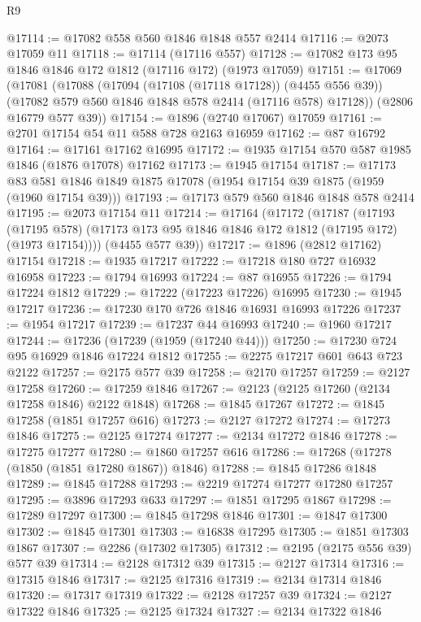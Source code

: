 \begin{lexlean}{R9}
\begin{coremodule}
@17114 := @17082 @558 @560 @1846 @1848 @557 @2414
@17116 := @2073 @17059 @11
@17118 := @17114 (@17116 @557)
@17128 := @17082 @173 @95 @1846 @1846 @172 @1812 (@17116 @172) (@1973 @17059)
@17151 := @17069
    (@17081
      (@17088
        (@17094 (@17108 (@17118 @17128)) (@4455 @556 @39))
        (@17082 @579 @560 @1846 @1848 @578 @2414 (@17116 @578) @17128))
      (@2806 @16779 @577 @39))
@17154 := @1896 (@2740 @17067) @17059
@17161 := @2701 @17154 @54 @11 @588 @728 @2163 @16959
@17162 := @87 @16792
@17164 := @17161 @17162 @16995
@17172 := @1935 @17154 @570 @587 @1985 @1846 (@1876 @17078) @17162
@17173 := @1945 @17154
@17187 := @17173
    @83
    @581
    @1846
    @1849
    @1875
    @17078
    (@1954 @17154 @39 @1875 (@1959 (@1960 @17154 @39)))
@17193 := @17173 @579 @560 @1846 @1848 @578 @2414
@17195 := @2073 @17154 @11
@17214 := @17164
    (@17172
      (@17187
        (@17193
          (@17195 @578)
          (@17173 @173 @95 @1846 @1846 @172 @1812 (@17195 @172) (@1973 @17154))))
      (@4455 @577 @39))
@17217 := @1896 (@2812 @17162) @17154
@17218 := @1935 @17217
@17222 := @17218 @180 @727 @16932 @16958
@17223 := @1794 @16993
@17224 := @87 @16955
@17226 := @1794 @17224 @1812
@17229 := @17222 (@17223 @17226) @16995
@17230 := @1945 @17217
@17236 := @17230 @170 @726 @1846 @16931 @16993 @17226
@17237 := @1954 @17217
@17239 := @17237 @44 @16993
@17240 := @1960 @17217
@17244 := @17236 (@17239 (@1959 (@17240 @44)))
@17250 := @17230 @724 @95 @16929 @1846 @17224 @1812
@17255 := @2275 @17217 @601 @643 @723 @2122
@17257 := @2175 @577 @39
@17258 := @2170 @17257
@17259 := @2127 @17258
@17260 := @17259 @1846
@17267 := @2123 (@2125 @17260 (@2134 @17258 @1846) @2122 @1848)
@17268 := @1845 @17267
@17272 := @1845 @17258 (@1851 @17257 @616)
@17273 := @2127 @17272
@17274 := @17273 @1846
@17275 := @2125 @17274
@17277 := @2134 @17272 @1846
@17278 := @17275 @17277
@17280 := @1860 @17257 @616
@17286 := @17268 (@17278 (@1850 (@1851 @17280 @1867)) @1846)
@17288 := @1845 @17286 @1848
@17289 := @1845 @17288
@17293 := @2219 @17274 @17277 @17280 @17257
@17295 := @3896 @17293 @633
@17297 := @1851 @17295 @1867
@17298 := @17289 @17297
@17300 := @1845 @17298 @1846
@17301 := @1847 @17300
@17302 := @1845 @17301
@17303 := @16838 @17295
@17305 := @1851 @17303 @1867
@17307 := @2286 (@17302 @17305)
@17312 := @2195 (@2175 @556 @39) @577 @39
@17314 := @2128 @17312 @39
@17315 := @2127 @17314
@17316 := @17315 @1846
@17317 := @2125 @17316
@17319 := @2134 @17314 @1846
@17320 := @17317 @17319
@17322 := @2128 @17257 @39
@17324 := @2127 @17322 @1846
@17325 := @2125 @17324
@17327 := @2134 @17322 @1846

\end{coremodule}
\end{lexlean}
